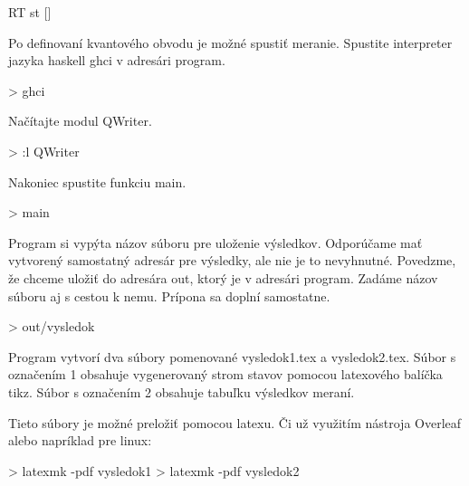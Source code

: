 \begin{code}
RT st []
\end{code}

Po definovaní kvantového obvodu je možné spustiť meranie. Spustite interpreter
jazyka haskell ghci v adresári program.
\begin{code}
> ghci
\end{code}

Načítajte modul QWriter.
\begin{code}
> :l QWriter
\end{code}

Nakoniec spustite funkciu main.
\begin{code}
> main
\end{code}

Program si vypýta názov súboru pre uloženie výsledkov. Odporúčame mať vytvorený
samostatný adresár pre výsledky, ale nie je to nevyhnutné. Povedzme, že chceme
uložiť do adresára out, ktorý je v adresári program. Zadáme názov súboru aj 
s cestou k nemu. Prípona sa doplní samostatne.
\begin{code}
> out/vysledok
\end{code}

Program vytvorí dva súbory pomenované vysledok1.tex a vysledok2.tex. Súbor
s označením 1 obsahuje vygenerovaný strom stavov pomocou latexového balíčka
tikz. Súbor s označením 2 obsahuje tabuľku výsledkov meraní.

Tieto súbory je možné preložiť pomocou latexu. Či už využitím nástroja Overleaf
alebo napríklad pre linux:
\begin{code}
> latexmk -pdf vysledok1
> latexmk -pdf vysledok2
\end{code}
